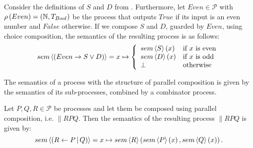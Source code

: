\begin{example}
\label{exp:sem_chice}
Consider the definitions of $S$ and $D$ from . Furthermore, let $Even \in \mathcal{P}$ with $\rho \left( Even \right) = \left( \mathbb{N}, T_{Bool} \right)$ be the process that outputs $True$ if its input is an even number and $False$ otherwise. If we compose $S$ and $D$, guarded by $Even$, using choice composition, the semantics of the resulting process is as follows:
  \begin{equation*}
    sem \left\langle \left( Even \to S \vee D \right) \right\rangle = x \mapsto \left\{\begin{array}{ll}
      sem \left\langle S \right\rangle\left(x\right) & \text{if } x \text{ is even} \\
      sem \left\langle D \right\rangle\left(x\right) & \text{if } x \text{ is odd} \\
      \bot & \text{otherwise}
    \end{array}\right.
  \end{equation*}
\end{example}


The semantics of a process with the structure of parallel composition is given by the semantics of its sub-processes, combined by a combinator process.
\begin{definition}
\label{def:sem_parallel}
Let $P, Q, R \in \mathcal{P}$ be processes and let them be composed using parallel composition, i.e. $\parallel{R}{P}{Q}$. Then the semantics of the resulting process $\parallel{R}{P}{Q}$ is given by:
  \begin{equation*}
    \label{eqn:sem_parallel}
    sem \left\langle \left( R \gets P \, | \, Q \right) \right\rangle = x \mapsto sem \left\langle R \right\rangle \left( sem \left\langle P \right\rangle \left( x \right), sem \left\langle Q \right\rangle \left( x \right) \right).
  \end{equation*}
  \hfill\qedsymbol
\end{definition}



